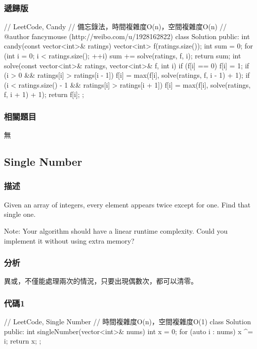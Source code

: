 \subsubsection{遞歸版}
\begin{Code}
// LeetCode, Candy
// 備忘錄法，時間複雜度O(n)，空間複雜度O(n)
// @author fancymouse (http://weibo.com/u/1928162822)
class Solution {
public:
    int candy(const vector<int>& ratings) {
        vector<int> f(ratings.size());
        int sum = 0;
        for (int i = 0; i < ratings.size(); ++i)
            sum += solve(ratings, f, i);
        return sum;
    }
    int solve(const vector<int>& ratings, vector<int>& f, int i) {
        if (f[i] == 0) {
            f[i] = 1;
            if (i > 0 && ratings[i] > ratings[i - 1])
                f[i] = max(f[i], solve(ratings, f, i - 1) + 1);
            if (i < ratings.size() - 1 && ratings[i] > ratings[i + 1])
                f[i] = max(f[i], solve(ratings, f, i + 1) + 1);
        }
        return f[i];
    }
};
\end{Code}


\subsubsection{相關題目}
\begindot
\item 無
\myenddot


\subsection{Single Number} %
\label{sec:single-number}


\subsubsection{描述}
Given an array of integers, every element appears twice except for one. Find that single one.

Note:
Your algorithm should have a linear runtime complexity. Could you implement it without using extra memory?


\subsubsection{分析}
異或，不僅能處理兩次的情況，只要出現偶數次，都可以清零。


\subsubsection{代碼1}
\begin{Code}
// LeetCode, Single Number
// 時間複雜度O(n)，空間複雜度O(1)
class Solution {
public:
    int singleNumber(vector<int>& nums) {
        int x = 0;
        for (auto i : nums) {
            x ^= i;
        }
        return x;
    }
};
\end{Code}



